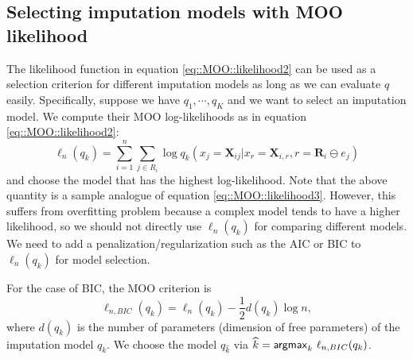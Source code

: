 \documentclass[aos, preprint]{imsart}
\theoremstyle{plain}
\theoremstyle{definition}
\let\hat\widehat
\newcommand{\bX}{\mathbf{X}}
\newcommand{\bR}{\mathbf{R}}
\begin{document}










\subsection{Selecting imputation models with MOO likelihood}

The likelihood function in equation \eqref{eq::MOO::likelihood2} can be used as a selection criterion 
for different imputation models
as long as we can evaluate $q$ easily. 
Specifically, suppose we have $q_1,\cdots, q_K$ and we want to select an imputation model. 
We compute their MOO log-likelihoods as in equation \eqref{eq::MOO::likelihood2}:
$$
\ell_n(q_k) = \sum_{i=1}^n\sum_{j \in R_i} \log q_k(x_j = \bX_{ij}|x_{r} = \bX_{i, r}, r = \bR_i\ominus e_j)
$$
and choose the model that has the highest log-likelihood. 
Note that the above quantity is a sample analogue of equation \eqref{eq::MOO::likelihood3}.
However, this  suffers from overfitting problem because 
a complex model tends to have a higher likelihood, 
so we should not directly use $\ell_n(q_k)$ for comparing different models.
We need to add a penalization/regularization such as the AIC \citep{akaike1974aic} or BIC \citep{schwarz1978bic} to $\ell_n(q_k)$ for model selection. 

For the case of BIC, the MOO criterion is 
\begin{equation}
\ell_{n, BIC}(q_k) = \ell_n(q_k) - \frac{1}{2} d(q_k) \log n,
\label{eq::BIC}
\end{equation}
where $d(q_k) $ is the number of parameters (dimension of free parameters) of the imputation model $q_k$.
We choose the model $q_{\hat k}$ via $\hat k = {\sf argmax}_k\,\, \ell_{n, BIC}(q_k)$.
\end{document}
